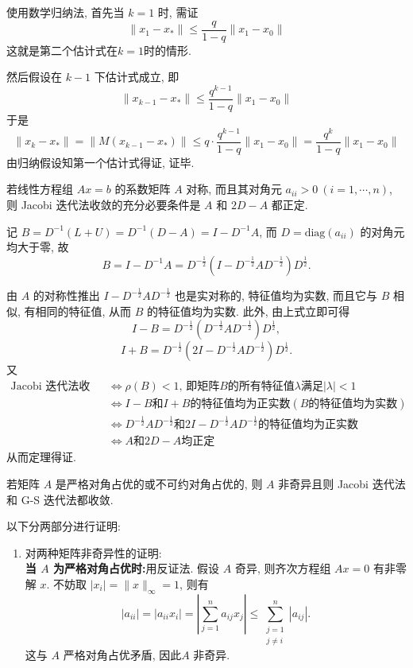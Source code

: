 \documentclass[12pt, answers]{exam}     %
\begin{document}
\begin{questions}
\begin{solution}
使用数学归纳法, 首先当 $k=1$ 时, 需证
\[
\|x_1 - x_*\| \leq \frac{q}{1-q}\|x_1 - x_0\|
\]
这就是第二个估计式在$k=1$时的情形. 

然后假设在 $k-1$ 下估计式成立, 即 
\[
\|x_{k-1} - x_*\| \leq \frac{q^{k-1}}{1 - q} \|x_1 - x_0\|
\]
于是
\[
\|x_k - x_*\| = \|M (x_{k-1} - x_*)\| \leq q \cdot \frac{q^{k-1}}{1 - q} \|x_1 - x_0\| = \frac{q^k}{1 - q} \|x_1 - x_0\|
\]
由归纳假设知第一个估计式得证, 证毕. 
\end{solution}


\question{}若线性方程组 \( Ax = b \) 的系数矩阵 \( A \) 对称, 而且其对角元 \( a_{ii} > 0 \ (i = 1, \cdots, n) \), 
则 Jacobi 迭代法收敛的充分必要条件是 \( A \) 和 \( 2D - A \) 都正定. 
\begin{solution}
记 \( B = D^{-1}(L + U) = D^{-1}(D - A) = I - D^{-1}A \), 而 \( D = \text{diag}(a_{ii}) \) 的对角元均大于零, 故
\[
B = I - D^{-1}A = D^{-\frac{1}{2}}(I - D^{-\frac{1}{2}}AD^{-\frac{1}{2}})D^{\frac{1}{2}}. 
\]

由 \( A \) 的对称性推出 \( I - D^{-\frac{1}{2}}AD^{-\frac{1}{2}} \) 也是实对称的, 特征值均为实数, 而且它与 \( B \) 相似, 有相同的特征值, 从而 \( B \) 的特征值均为实数. 此外, 由上式立即可得
\[
I - B = D^{-\frac{1}{2}}(D^{-\frac{1}{2}}AD^{-\frac{1}{2}})D^{\frac{1}{2}}, 
\]
\[
I + B = D^{-\frac{1}{2}}(2I - D^{-\frac{1}{2}}AD^{-\frac{1}{2}})D^{\frac{1}{2}}. 
\]
又
\begin{align*}
\text{Jacobi 迭代法收敛} &\Leftrightarrow \rho(B) < 1 \text{, 即矩阵} B \text{的所有特征值} \lambda \text{满足} |\lambda| < 1 \\
&\Leftrightarrow I - B \text{和} I + B \text{的特征值均为正实数} \left( B\text{的特征值均为实数} \right) \\
&\Leftrightarrow D^{-\frac{1}{2}}AD^{-\frac{1}{2}} \text{和} 2I - D^{-\frac{1}{2}}AD^{-\frac{1}{2}} \text{的特征值均为正实数} \\
&\Leftrightarrow A \text{和} 2D - A \text{均正定}
\end{align*}
从而定理得证. 
\end{solution}


\question{}若矩阵 \( A \) 是严格对角占优的或不可约对角占优的, 则 \( A \) 非奇异且则 Jacobi 迭代法和 G-S 迭代法都收敛. 
\begin{solution}以下分两部分进行证明:
\begin{enumerate}
    \item
    对两种矩阵非奇异性的证明:   \\
    \noindent\textbf{当 $ A $ 为严格对角占优时:}用反证法. 假设 \( A \) 奇异, 则齐次方程组 \( Ax = 0 \) 有非零解 \( x \). 不妨取 \( |x_i| = \|x\|_{\infty} = 1 \), 则有
    \[
    |a_{ii}| = |a_{ii}x_i| = \left| \sum_{j=1}^{n} a_{ij}x_j \right| \leq \sum_{\substack{j=1 \\ j \neq i}}^{n} |a_{ij}|. 
    \]
    这与 \( A \) 严格对角占优矛盾, 因此\( A \) 非奇异. 


\end{enumerate}
\end{solution}
\end{questions}
\end{document}
